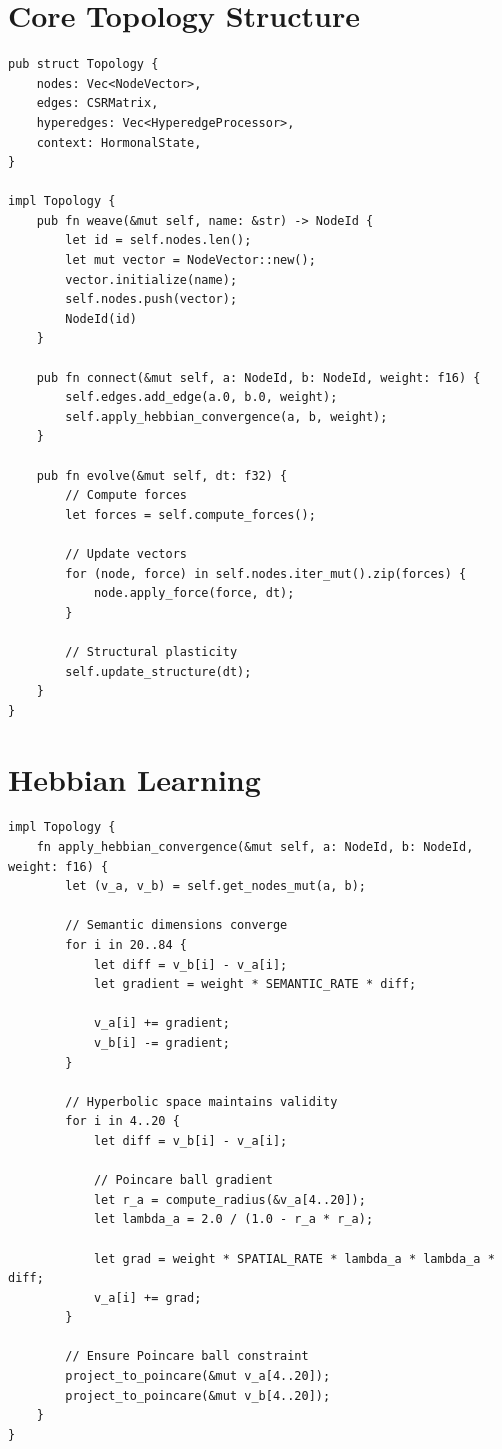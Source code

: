 \documentclass[12pt,a4paper,openany]{book} %
\begin{document}
\section{Core Topology Structure}

\begin{lstlisting}[style=rust]
pub struct Topology {
    nodes: Vec<NodeVector>,
    edges: CSRMatrix,
    hyperedges: Vec<HyperedgeProcessor>,
    context: HormonalState,
}

impl Topology {
    pub fn weave(&mut self, name: &str) -> NodeId {
        let id = self.nodes.len();
        let mut vector = NodeVector::new();
        vector.initialize(name);
        self.nodes.push(vector);
        NodeId(id)
    }

    pub fn connect(&mut self, a: NodeId, b: NodeId, weight: f16) {
        self.edges.add_edge(a.0, b.0, weight);
        self.apply_hebbian_convergence(a, b, weight);
    }

    pub fn evolve(&mut self, dt: f32) {
        // Compute forces
        let forces = self.compute_forces();

        // Update vectors
        for (node, force) in self.nodes.iter_mut().zip(forces) {
            node.apply_force(force, dt);
        }

        // Structural plasticity
        self.update_structure(dt);
    }
}
\end{lstlisting}
\vspace{0.5em}

\section{Hebbian Learning}

\begin{lstlisting}[style=rust]
impl Topology {
    fn apply_hebbian_convergence(&mut self, a: NodeId, b: NodeId, weight: f16) {
        let (v_a, v_b) = self.get_nodes_mut(a, b);

        // Semantic dimensions converge
        for i in 20..84 {
            let diff = v_b[i] - v_a[i];
            let gradient = weight * SEMANTIC_RATE * diff;

            v_a[i] += gradient;
            v_b[i] -= gradient;
        }

        // Hyperbolic space maintains validity
        for i in 4..20 {
            let diff = v_b[i] - v_a[i];

            // Poincare ball gradient
            let r_a = compute_radius(&v_a[4..20]);
            let lambda_a = 2.0 / (1.0 - r_a * r_a);

            let grad = weight * SPATIAL_RATE * lambda_a * lambda_a * diff;
            v_a[i] += grad;
        }

        // Ensure Poincare ball constraint
        project_to_poincare(&mut v_a[4..20]);
        project_to_poincare(&mut v_b[4..20]);
    }
}
\end{lstlisting}
\vspace{0.5em}
\end{document}
